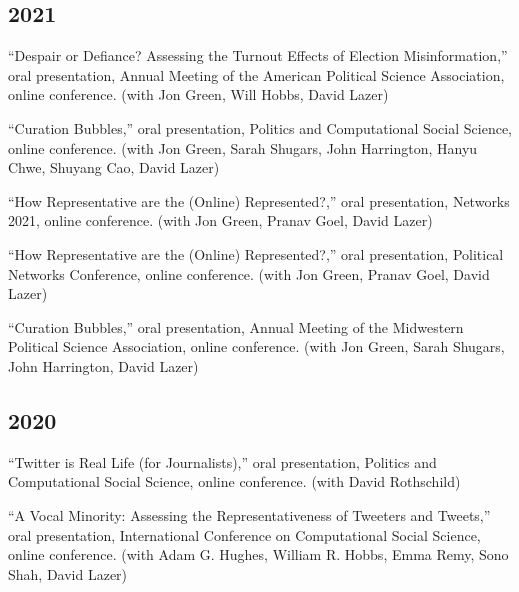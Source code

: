 \documentclass[11pt, letter]{article}
\begin{document}
\subsection{2021}
\begin{hangparas}{.25in}{1}
``Despair or Defiance? Assessing the Turnout Effects of Election
Misinformation,'' oral presentation, Annual Meeting of the American Political
Science Association, online conference. (with Jon Green, Will Hobbs, David
Lazer) \vspace{2mm}

``Curation Bubbles,'' oral presentation, Politics and Computational Social
Science, online conference. (with Jon Green, Sarah Shugars, John Harrington,
Hanyu Chwe, Shuyang Cao, David Lazer) \vspace{2mm}

``How Representative are the (Online) Represented?,'' oral presentation,
Networks 2021, online conference. (with Jon Green, Pranav
Goel, David Lazer) \vspace{2mm}

``How Representative are the (Online) Represented?,'' oral presentation,
Political Networks Conference, online conference. (with Jon Green, Pranav
Goel, David Lazer) \vspace{2mm}

``Curation Bubbles,'' oral presentation, Annual Meeting of the Midwestern
Political Science Association, online conference. (with Jon Green, Sarah
Shugars, John Harrington, David Lazer) \vspace{2mm}
\end{hangparas}

\subsection{2020}
\begin{hangparas}{.25in}{1}
``Twitter is Real Life (for Journalists),'' oral presentation, Politics and
Computational Social Science, online conference. (with David
Rothschild) \vspace{2mm}

``A Vocal Minority: Assessing the Representativeness of Tweeters and Tweets,''
oral presentation, International Conference on Computational Social Science,
online conference. (with Adam G. Hughes, William R. Hobbs, Emma Remy, Sono
Shah, David Lazer) \vspace{2mm}
\end{hangparas}
\end{document}
